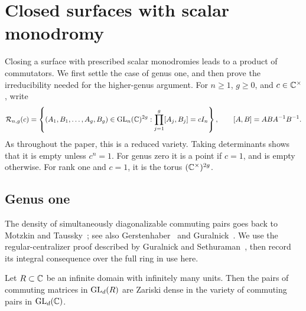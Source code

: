 \section{Closed surfaces with scalar monodromy}
\label{sec:surfaces}

Closing a surface with prescribed scalar monodromies leads to a product
of commutators.  We first settle the case of genus one, and then prove
the irreducibility needed for the higher-genus argument.  For
\(n\geq1\), \(g\geq0\), and \(c\in\mathbb C^\times\), write
\[
 \mathcal R_{n,g}(c)=
 \left\{(A_1,B_1,\ldots,A_g,B_g)\in\operatorname{GL}_n(\mathbb C)^{2g}:
       \prod_{j=1}^g[A_j,B_j]=cI_n\right\},
 \qquad [A,B]=ABA^{-1}B^{-1}.
\]
As throughout the paper, this is a reduced variety.  Taking determinants
shows that it is empty unless \(c^n=1\).  For genus zero it is a point
if \(c=1\), and is empty otherwise.  For rank one and \(c=1\), it is
the torus \((\mathbb C^\times)^{2g}\).

\subsection{Genus one}

The density of simultaneously diagonalizable commuting pairs goes back
to Motzkin and Taussky~\cite{MotzkinTaussky1955}; see also
Gerstenhaber~\cite{Gerstenhaber1961} and Guralnick~\cite{Guralnick1992}.
We use the regular-centralizer proof described by Guralnick and
Sethuraman~\cite[Section~3, Proposition~6]{GuralnickSethuraman2000},
then record its integral consequence over the full ring in use here.

\begin{lemma}\label{lem:commuting-density}
Let \(R\subset\mathbb C\) be an infinite domain with infinitely many units.
Then the pairs of commuting matrices in \(\operatorname{GL}_d(R)\) are Zariski dense
in the variety of commuting pairs in \(\operatorname{GL}_d(\mathbb C)\).
\end{lemma}

